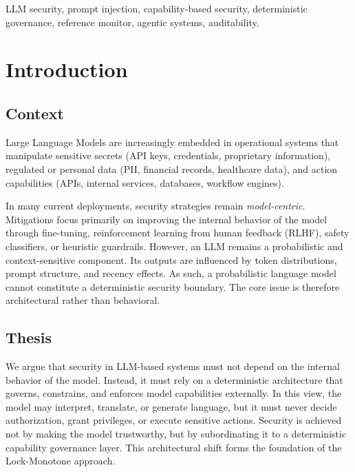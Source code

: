 \documentclass[conference]{IEEEtran}
\begin{document}
\begin{IEEEkeywords}
LLM security, prompt injection, capability-based security, deterministic
governance, reference monitor, agentic systems, auditability.
\end{IEEEkeywords}

\section{Introduction}

\subsection{Context}
Large Language Models are increasingly embedded in operational systems
that manipulate sensitive secrets (API keys, credentials, proprietary
information), regulated or personal data (PII, financial records,
healthcare data), and action capabilities (APIs, internal services,
databases, workflow engines).

In many current deployments, security strategies remain
\emph{model-centric}. Mitigations focus primarily on improving the
internal behavior of the model through fine-tuning, reinforcement
learning from human feedback (RLHF), safety classifiers, or heuristic
guardrails. However, an LLM remains a probabilistic and context-sensitive
component. Its outputs are influenced by token distributions, prompt
structure, and recency effects. As such, a probabilistic language model
cannot constitute a deterministic security boundary. The core issue is
therefore architectural rather than behavioral.

\subsection{Thesis}
We argue that security in LLM-based systems must not depend on the
internal behavior of the model. Instead, it must rely on a deterministic
architecture that governs, constrains, and enforces model capabilities
externally. In this view, the model may interpret, translate, or generate
language, but it must never decide authorization, grant privileges, or
execute sensitive actions. Security is achieved not by making the model
trustworthy, but by subordinating it to a deterministic capability
governance layer. This architectural shift forms the foundation of the
Lock-Monotone approach.
\end{document}
